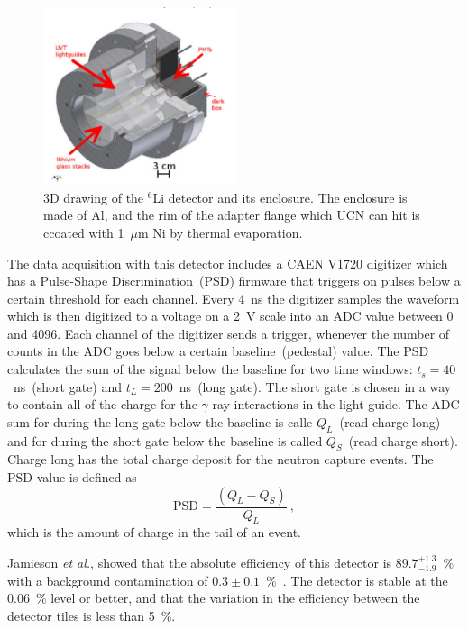 \begin{figure}[h!]
  \centering
  \includegraphics[width=0.5\textwidth]{Li6detector.png}
  \caption[3D drawing of the $^6$Li detector and its enclosure]{3D
    drawing of the $^6$Li detector and its enclosure. The enclosure is
    made of Al, and the rim of the adapter flange which UCN can hit is
    ccoated with 1~$\mu$m Ni by thermal evaporation. }
  \label{fig:Li6detector}
\end{figure}

The data acquisition with this detector includes a CAEN V1720
digitizer which has a Pulse-Shape Discrimination~(PSD) firmware that
triggers on pulses below a certain threshold for each channel. Every
4~ns the digitizer samples the waveform which is then digitized to a
voltage on a 2~V scale into an ADC value between 0 and 4096. Each
channel of the digitizer sends a trigger, whenever the number of
counts in the ADC goes below a certain baseline~(pedestal) value. The
PSD calculates the sum of the signal below the baseline for two time
windows: $t_s = 40$~ns~(short gate) and $t_L = 200$~ns~(long
gate). The short gate is chosen in a way to contain all of the charge
for the $\gamma$-ray interactions in the light-guide. The ADC sum for
during the long gate below the baseline is calle $Q_L$~(read charge
long) and for during the short gate below the baseline is called
$Q_S$~(read charge short). Charge long has the total charge deposit
for the neutron capture events. The PSD value is defined as
\begin{equation}
  \label{eq:psd}
  \mathrm{PSD} = \frac{\left( Q_L - Q_S\right)}{Q_L}~,
\end{equation}  
which is the amount of charge in the tail of an event.

Jamieson {\it{et al.}}, showed that the absolute efficiency of this
detector is $89.7^{+1.3}_{-1.9}$~\% with a background contamination of
$0.3 \pm 0.1$~\%~\cite{jamieson2017characterization}. The detector is
stable at the 0.06~\% level or better, and that the variation in the
efficiency between the detector tiles is less than 5~\%.
